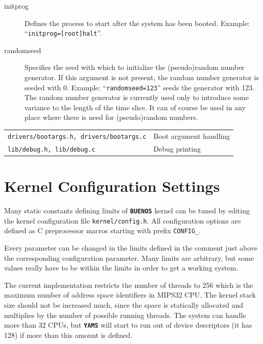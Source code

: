 \documentclass[twoside,a4paper]{report}
\newcommand{\PBS}[1]{\let\temp=\\#1\let\\=\temp}
\newlength{\tablewidth}
\newcommand{\buenos}{\texttt{\textbf{BUENOS}}}
\newcommand{\yams}{\texttt{\textbf{YAMS}}}
\newenvironment{filelist}[0]{%
\vspace{\baselineskip}%
\begin{center}%
\begin{tabular}{p{4cm}>{\PBS\raggedright}p{\tablewidth-4\tabcolsep-4cm}}%
\hline%
}{%
\end{tabular}%
\end{center}%
}
\newcommand{\file}[2]{\texttt{#1} \vspace{2mm} & #2 \vspace{2mm}\\}
\begin{document}
\begin{description}
\item[initprog] Defines the process to start after the system has
been booted. Example: ``\texttt{initprog=[root]halt}''.


\item[randomseed] Specifies the seed with which to initialize the
(pseudo)random number generator. If this argument is not present, the
random number generator is seeded with 0. Example:
``\texttt{randomseed=123}'' seeds the generator with 123. The random
number generator is currently used only to introduce some variance to
the length of the time slice. It can of course be used in any place
where there is need for (pseudo)random numbers.
\end{description}

\begin{filelist}

\file{drivers/bootargs.h, drivers/bootargs.c}{Boot argument handling}
\file{lib/debug.h, lib/debug.c}{Debug printing}

\end{filelist}

\chapter{Kernel Configuration Settings}


Many static constants defining limits of \buenos{} kernel can be tuned
by editing the kernel configuration file \texttt{kernel/config.h}. All
configuration options are defined as C preprocessor macros starting
with prefix \texttt{CONFIG\_}.

Every parameter can be changed in the limits defined in the comment just
above the corresponding configuration parameter. Many limits are
arbitrary, but some values really have to be within the limits in
order to get a working system.

The current implementation restricts the number of threads to 256
which is the maximum number of address space identifiers in MIPS32 CPU.
The kernel stack size should not be increased much, since the space is
statically allocated and multiplies by the number of possible running
threads. The system can handle more than 32 CPUs, but \yams{} will
start to run out of device descriptors (it has 128) if more than this
amount is defined.
\end{document}
